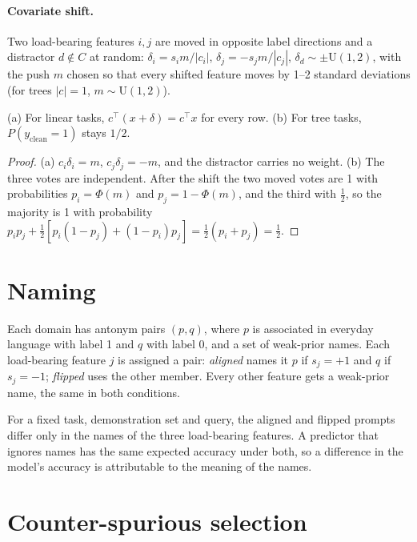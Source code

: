 \paragraph{Covariate shift.}
Two load-bearing features $i, j$ are moved in opposite label directions and a distractor $d \notin C$ at random:
$\delta_i = s_i m/|c_i|$, $\delta_j = -s_j m/|c_j|$, $\delta_d \sim \pm\mathrm{U}(1,2)$, with the push $m$ chosen so that every shifted feature moves by 1--2 standard deviations (for trees $|c| = 1$, $m \sim \mathrm{U}(1,2)$).

\begin{lemma}
(a) For linear tasks, $c^\top(x + \delta) = c^\top x$ for every row. (b) For tree tasks, $P(y_{\mathrm{clean}} = 1)$ stays $1/2$.
\end{lemma}
\begin{proof}
(a) $c_i\delta_i = m$, $c_j\delta_j = -m$, and the distractor carries no weight. (b) The three votes are independent. After the shift the two moved votes are 1 with probabilities $p_i = \Phi(m)$ and $p_j = 1 - \Phi(m)$, and the third with $\tfrac12$, so the majority is 1 with probability $p_i p_j + \tfrac12[p_i(1-p_j) + (1-p_i)p_j] = \tfrac12(p_i + p_j) = \tfrac12$.
\end{proof}

\section{Naming}

Each domain has antonym pairs $(p, q)$, where $p$ is associated in everyday language with label 1 and $q$ with label 0, and a set of weak-prior names.
Each load-bearing feature $j$ is assigned a pair: \emph{aligned} names it $p$ if $s_j = +1$ and $q$ if $s_j = -1$; \emph{flipped} uses the other member.
Every other feature gets a weak-prior name, the same in both conditions.

\begin{proposition}[Identification]
For a fixed task, demonstration set and query, the aligned and flipped prompts differ only in the names of the three load-bearing features. A predictor that ignores names has the same expected accuracy under both, so a difference in the model's accuracy is attributable to the meaning of the names.
\end{proposition}

\section{Counter-spurious selection}

